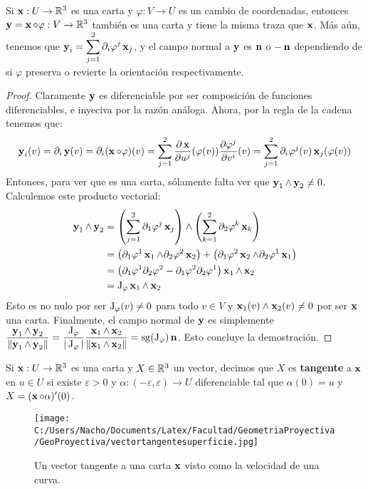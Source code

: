 \begin{prop}\label{prop::cartacambiodecoordenadas}
Si $\x:U\to\RR^3$ es una carta y $\varphi:V\to U$ es un cambio de coordenadas, entonces $\y=\x\circ\varphi:V\to\RR^3$ también es una carta y tiene la misma traza que $\x$. Más aún, tenemos que $\y_i = \displaystyle\sum_{j=1}^2 \partial_i \varphi^j \x_j$, y el campo normal a $\y$ es $\n$ o $-\n$ dependiendo de si $\varphi$ preserva o revierte la orientación respectivamente.
\begin{proof}
Claramente $\y$ es diferenciable por ser composición de funciones diferenciables, e inyeciva por la razón análoga. Ahora, por la regla de la cadena tenemos que: $$\y_i(v)=\partial_i\y(v)=\partial_i (\x\circ\varphi)(v)=\displaystyle\sum_{j=1}^2 \dfrac{\partial\x}{\partial u^j}(\varphi(v))\dfrac{\partial\varphi^j}{\partial v^i}(v) = \displaystyle\sum_{j=1}^2 \partial_i\varphi^j(v)\x_j(\varphi(v))$$ Entonces, para ver que es una carta, sólamente falta ver que $\y_1\wedge\y_2\neq 0$. Calculemos este producto vectorial:
\begin{align*}
\y_1\wedge\y_2 &= \left(\displaystyle\sum_{j=1}^2 \partial_1 \varphi^j\x_j\right)\wedge\left(\displaystyle\sum_{k=1}^2 \partial_2 \varphi^k\x_k\right) \\ &= \left(\partial_1\varphi^1\x_1\wedge\partial_2\varphi^2\x_2\right) + \left(\partial_1\varphi^2\x_2\wedge\partial_2\varphi^1\x_1\right)\\
&=\left(\partial_1\varphi^1\partial_2\varphi^2 - \partial_1\varphi^2\partial_2\varphi^1\right) \x_1\wedge \x_2\\
&= \J_\varphi \x_1\wedge\x_2
\end{align*}
Esto es no nulo por ser $\J_\varphi(v)\neq 0$ para todo $v\in V$ y $\x_1(v)\wedge\x_2(v)\neq 0$ por ser $\x$ una carta. Finalmente, el campo normal de $\y$ es simplemente $\dfrac{\y_1\wedge\y_2}{\norm{\y_1\wedge\y_2}} = \dfrac{\J_\varphi}{|\J_\varphi|}\dfrac{\x_1\wedge\x_2}{\norm{\x_1\wedge\x_2}} = \sg(\J_\varphi)\n$. Esto concluye la demostración.
\end{proof}
\end{prop}

\begin{defn}
Si $\x:U\to\RR^3$ es una carta y $X\in\RR^3$ un vector, decimos que $X$ es \textbf{tangente} a $\x$ en $u\in U$ si existe $\varepsilon>0$ y $\alpha:(-\varepsilon,\varepsilon)\to U$ diferenciable tal que $\alpha(0)=u$ y $X = (\x\circ\alpha)'(0)$.
\begin{figure}[h]
	\centering
		\texttt{[image: C:/Users/Nacho/Documents/Latex/Facultad/GeometriaProyectiva/GeoProyectiva/vectortangentesuperficie.jpg]}
	\caption{Un vector tangente a una carta $\x$ visto como la velocidad de una curva.}
	\label{fig:vectortangentesuperficie}
\end{figure}
\end{defn}

